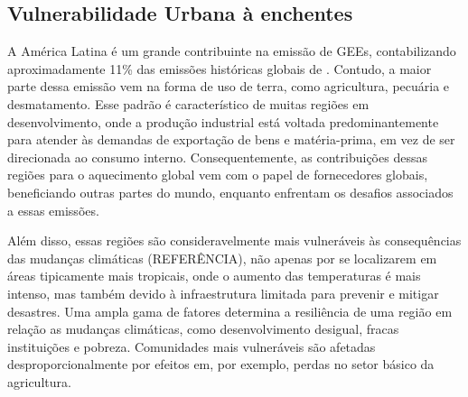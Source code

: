 
\subsection{Vulnerabilidade Urbana à enchentes} %
A América Latina é um grande contribuinte na emissão de GEEs, contabilizando aproximadamente 11\% das emissões
históricas globais de  \cite{friedlingstein}. Contudo, a maior parte dessa emissão vem na forma de uso de terra,
como agricultura, pecuária e desmatamento. Esse padrão é característico de muitas regiões em desenvolvimento, onde a
produção industrial está voltada predominantemente para atender às demandas de exportação de bens e matéria-prima, em
vez de ser direcionada ao consumo interno. Consequentemente, as contribuições dessas regiões para o aquecimento global
vem com o papel de fornecedores globais, beneficiando outras partes do mundo, enquanto enfrentam os desafios associados
a essas emissões. 

Além disso, essas regiões são consideravelmente mais vulneráveis às consequências das mudanças climáticas (REFERÊNCIA),
não apenas por se localizarem em áreas tipicamente mais tropicais, onde o aumento das temperaturas é mais intenso, mas
também devido à infraestrutura limitada para prevenir e mitigar desastres. Uma ampla gama de fatores determina a
resiliência de uma região em relação as mudanças climáticas, como desenvolvimento desigual, fracas instituições e
pobreza. Comunidades mais vulneráveis são afetadas desproporcionalmente por efeitos em, por exemplo, perdas no setor
básico da agricultura.

